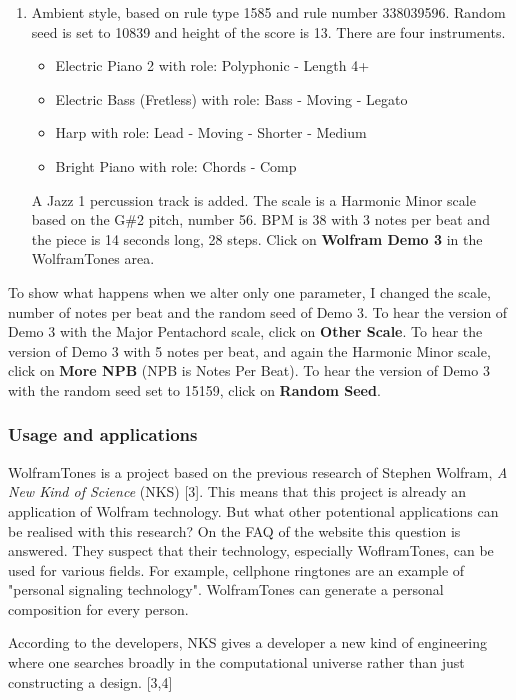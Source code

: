 \documentclass[12pt]{article}
\begin{document}
\begin{enumerate}
\item Ambient style, based on rule type 1585 and rule number 338039596. Random seed is set to 10839 and height of the score is 13.
There are four instruments.
\begin{itemize}
\item Electric Piano 2 with role: Polyphonic - Length 4+
\item Electric Bass (Fretless) with role: Bass - Moving - Legato
\item Harp with role: Lead - Moving - Shorter - Medium
\item Bright Piano with role: Chords - Comp
\end{itemize}
A Jazz 1 percussion track is added. The scale is a Harmonic Minor scale based on the G\#2 pitch, number 56. BPM is 38 with 3 notes per beat and the piece is 14 seconds long, 28 steps. Click on \textbf{Wolfram Demo 3} in the WolframTones area.
\end{enumerate}

To show what happens when we alter only one parameter, I changed the scale, number of notes per beat and the random seed of Demo 3. To hear the version of Demo 3 with the Major Pentachord scale, click on \textbf{Other Scale}. To hear the version of Demo 3 with 5 notes per beat, and again the Harmonic Minor scale, click on \textbf{More NPB} (NPB is Notes Per Beat). To hear the version of Demo 3 with the random seed set to 15159, click on \textbf{Random Seed}.

\subsubsection{Usage and applications}
 
WolframTones is a project based on the previous research of Stephen Wolfram, \textit{A New Kind of Science} (NKS) [3]. This means that this project is already an application of Wolfram technology. But what other potentional applications can be realised with this research? On the FAQ of the website this question is answered. They suspect that their technology, especially WoflramTones, can be used for various fields. For example, cellphone ringtones are an example of "personal signaling technology". WolframTones can generate a personal composition for every person.
\newline

According to the developers, NKS gives a developer a new kind of engineering where one searches broadly in the computational universe rather than just constructing a design. [3,4] 
\end{document}
